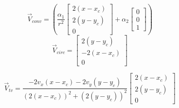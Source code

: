 \documentclass[conf]{new-aiaa}
\begin{document}
\begin{equation}\label{eq:vconv_circle}
\overrightarrow{V}_{conv} = \left(\frac{\alpha_1}{r^2} \begin{bmatrix}  2(x-x_c) \\ 2(y-y_c) \\ 0\end{bmatrix} + \alpha_2 \begin{bmatrix}  0 \\ 0 \\ 1 \end{bmatrix}\right)
\end{equation}
\begin{equation}\label{eq:vcirc_circle}
\overrightarrow{V}_{circ} =  \begin{bmatrix}  2(y-y_c) \\ -2(x-x_c) \\ 0\end{bmatrix}
\end{equation}

\begin{equation}\label{eq:vtv_circle}
\overrightarrow{V}_{tv} =  \frac{-2 v_x(x - x_c) - 2 v_y(y - y_c)}{(2(x-x_c))^2+(2(y-y_c))^2} \begin{bmatrix} 2 (x-x_c) \\ 2 (y-y_c) \\ 0 \end{bmatrix}
\end{equation}
\end{document}
